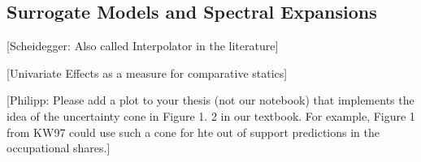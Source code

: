\subsection{Surrogate Models and Spectral Expansions}

[Scheidegger: Also called Interpolator in the literature]

[Univariate Effects as a measure for comparative statics]

[Philipp: Please add a plot to your thesis (not our notebook) that implements the idea of the uncertainty cone in Figure 1. 2 in our textbook. For example, Figure 1 from KW97 could use such a cone for hte out of support predictions in the occupational shares.]

\newpage
